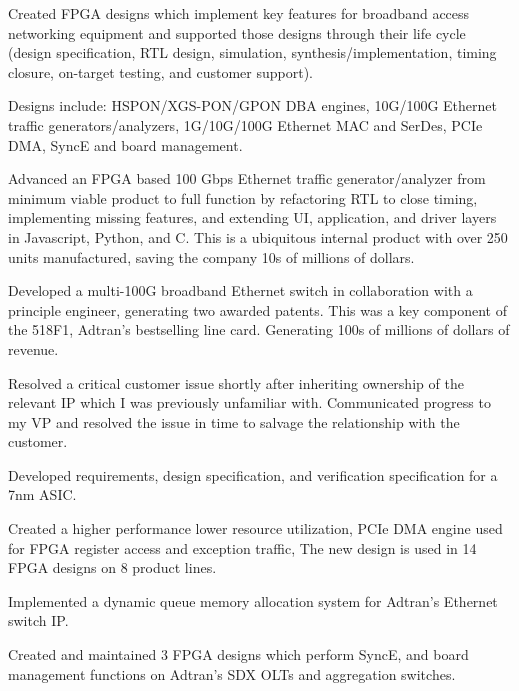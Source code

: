 \documentclass[10pt]{deedy-resume-reversed}
\begin{document}
\begin{minipage}[t]{1.0\textwidth}
\newline
{}
\vspace{\topsep} %
\begin{tightemize}
\item Created FPGA designs which implement key features for broadband access networking equipment and
supported those designs through their life cycle (design specification, RTL design, simulation,
synthesis/implementation, timing closure, on-target testing, and customer support).
\item Designs include: HSPON/XGS-PON/GPON DBA engines, 10G/100G Ethernet traffic generators/analyzers,
1G/10G/100G Ethernet MAC and SerDes, PCIe DMA, SyncE and board management.
\item Advanced an FPGA based 100 Gbps Ethernet traffic generator/analyzer from minimum viable product to full
function by refactoring RTL to close timing, implementing missing features, and extending UI,
application, and driver layers in Javascript, Python, and C. This is a ubiquitous internal product with
over 250 units manufactured, saving the company 10s of millions of dollars.
\item Developed a multi-100G broadband Ethernet switch in collaboration with a principle engineer, generating two awarded patents.
This was a key component of the 518F1, Adtran’s bestselling line card. Generating 100s of millions of dollars of revenue.
\item Resolved a critical customer issue shortly after inheriting ownership of the relevant IP which I was previously unfamiliar with.
Communicated progress to my VP and resolved the issue in time to salvage the relationship with the customer.
\item Developed requirements, design specification, and verification specification for a 7nm ASIC.
\item Created a higher performance lower resource utilization, PCIe DMA engine used for FPGA register access and exception traffic,
The new design is used in 14 FPGA designs on 8 product lines.
\item Implemented a dynamic queue memory allocation system for Adtran’s Ethernet switch IP.
\item Created and maintained 3 FPGA designs which perform SyncE, and board management functions on Adtran's SDX OLTs and aggregation switches.

\end{tightemize}
\end{minipage}
\end{document}
